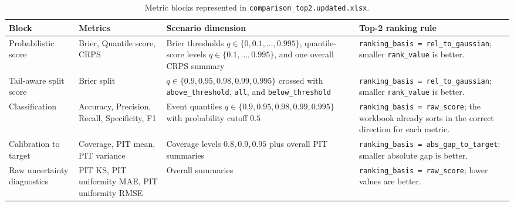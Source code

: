 \documentclass[11pt]{article}
\begin{document}
\begin{table}[htbp]
\centering
\small
\begin{tabularx}{\linewidth}{@{}P{2.6cm}P{3.3cm}P{4.7cm}Y@{}}
\toprule
Block & Metrics & Scenario dimension & Top-2 ranking rule \\
\midrule
Probabilistic score & Brier, Quantile score, CRPS & Brier thresholds
\(q \in \{0, 0.1, \ldots, 0.995\}\), quantile-score levels
\(q \in \{0.1, \ldots, 0.995\}\), and one overall CRPS summary &
\texttt{ranking\_basis = rel\_to\_gaussian}; smaller
\texttt{rank\_value} is better. \\
Tail-aware split score & Brier split & \(q \in \{0.9, 0.95, 0.98, 0.99,
0.995\}\) crossed with \texttt{above\_threshold}, \texttt{all}, and
\texttt{below\_threshold} & \texttt{ranking\_basis = rel\_to\_gaussian};
smaller \texttt{rank\_value} is better. \\
Classification & Accuracy, Precision, Recall, Specificity, F1 & Event
quantiles \(q \in \{0.9, 0.95, 0.98, 0.99, 0.995\}\) with probability cutoff
\(0.5\) & \texttt{ranking\_basis = raw\_score}; the workbook already sorts in
the correct direction for each metric. \\
Calibration to target & Coverage, PIT mean, PIT variance & Coverage levels
\(0.8, 0.9, 0.95\) plus overall PIT summaries & \texttt{ranking\_basis =
abs\_gap\_to\_target}; smaller absolute gap is better. \\
Raw uncertainty diagnostics & PIT KS, PIT uniformity MAE, PIT uniformity RMSE
& Overall summaries & \texttt{ranking\_basis = raw\_score}; lower values are
better. \\
\bottomrule
\end{tabularx}
\caption{Metric blocks represented in \texttt{comparison\_top2.updated.xlsx}.}
\end{table}
\end{document}
